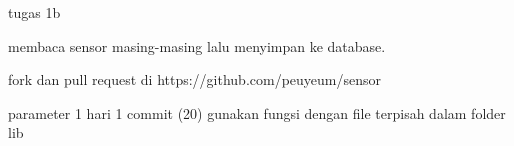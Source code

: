 tugas 1b

membaca sensor masing-masing lalu menyimpan ke database.

fork dan pull request di https://github.com/peuyeum/sensor

parameter
1 hari 1 commit (20)
gunakan fungsi dengan file terpisah dalam folder lib